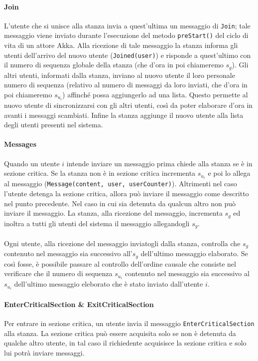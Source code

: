 \documentclass[a4paper]{report}
\begin{document}
\paragraph{Join}
L'utente che si unisce alla stanza invia a quest'ultima un messaggio di \texttt{Join}; tale messaggio viene inviato durante l'esecuzione del metodo \texttt{preStart()} del ciclo di vita di un attore Akka.
Alla ricezione di tale messaggio la stanza informa gli utenti dell'arrivo del nuovo utente (\texttt{Joined(user)}) e risponde a quest'ultimo con il numero di sequenza globale della stanza (che d'ora in poi chiameremo $s_g$).
Gli altri utenti, informati dalla stanza, inviano al nuovo utente il loro personale numero di sequenza (relativo al numero di messaggi da loro inviati, che d'ora in poi chiameremo $s_{u_i}$) affinché possa aggiungerlo ad una lista. Questo permette al nuovo utente di sincronizzarsi con gli altri utenti, così da poter elaborare d'ora in avanti i messaggi scambiati.
Infine la stanza aggiunge il nuovo utente alla lista degli utenti presenti nel sistema.

\paragraph{Messages}
Quando un utente $i$ intende inviare un messaggio prima chiede alla stanza se è in sezione critica. Se la stanza non è in sezione critica incrementa $s_{u_i}$ e poi lo allega al messaggio (\texttt{Message(content, user, userCounter)}).
Altrimenti nel caso l'utente detenga la sezione critica, allora può inviare il messaggio come descritto nel punto precedente. Nel caso in cui sia detenuta da qualcun altro non può inviare il messaggio.
La stanza, alla ricezione del messaggio, incrementa $s_g$ ed inoltra a tutti gli utenti del sistema il messaggio allegandogli $s_g$.
\\~\\
Ogni utente, alla ricezione del messaggio inviatogli dalla stanza, controlla che $s_g$ contenuto nel messaggio sia successivo all'$s_g$ dell'ultimo messaggio elaborato. Se così fosse, è possibile passare al controllo dell'ordine causale che consiste nel verificare che il numero di sequenza $s_{u_i}$ contenuto nel messaggio sia successivo al $s_{u_i}$ dell'ultimo messaggio eleborato che è stato inviato dall'utente $i$.

\paragraph{EnterCriticalSection \& ExitCriticalSection}
Per entrare in sezione critica, un utente invia il messaggio \texttt{EnterCriticalSection} alla stanza. La sezione critica può essere acquisita solo se non è detenuta da qualche altro utente, in tal caso il richiedente acquisisce la sezione critica e solo lui potrà inviare messaggi.
\end{document}
